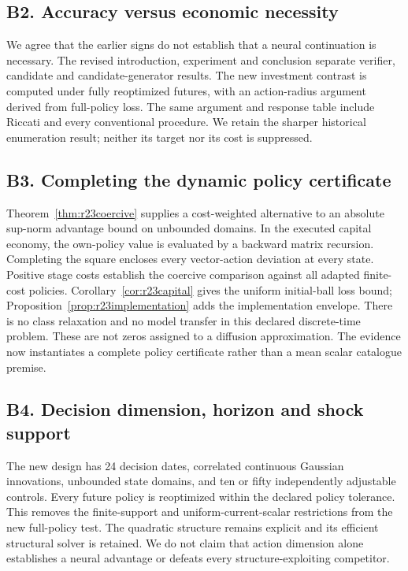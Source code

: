 \subsection*{B2. Accuracy versus economic necessity}
We agree that the earlier signs do not establish that a neural continuation
is necessary. The revised introduction, experiment and conclusion separate
verifier, candidate and candidate-generator results. The new investment
contrast is computed under fully reoptimized futures, with an action-radius
argument derived from full-policy loss. The same argument and response table
include Riccati and every conventional procedure. We retain the sharper
historical enumeration result; neither its target nor its cost is suppressed.

\subsection*{B3. Completing the dynamic policy certificate}
Theorem~\ref{thm:r23coercive} supplies a cost-weighted alternative to an
absolute sup-norm advantage bound on unbounded domains. In the executed
capital economy, the own-policy value is evaluated by a backward matrix
recursion. Completing the square encloses every vector-action deviation at
every state. Positive stage costs establish the coercive comparison against
all adapted finite-cost policies. Corollary~\ref{cor:r23capital} gives the
uniform initial-ball loss bound; Proposition~\ref{prop:r23implementation}
adds the implementation envelope. There is no class relaxation and no model
transfer in this declared discrete-time problem. These are not zeros
assigned to a diffusion approximation. The evidence now instantiates a
complete policy certificate rather than a mean scalar catalogue premise.

\subsection*{B4. Decision dimension, horizon and shock support}
The new design has 24 decision dates, correlated continuous Gaussian
innovations, unbounded state domains, and ten or fifty independently
adjustable controls. Every future policy is reoptimized within the declared
policy tolerance. This removes the finite-support and uniform-current-scalar
restrictions from the new full-policy test. The quadratic structure remains
explicit and its efficient structural solver is retained. We do not claim
that action dimension alone establishes a neural advantage or defeats every
structure-exploiting competitor.

